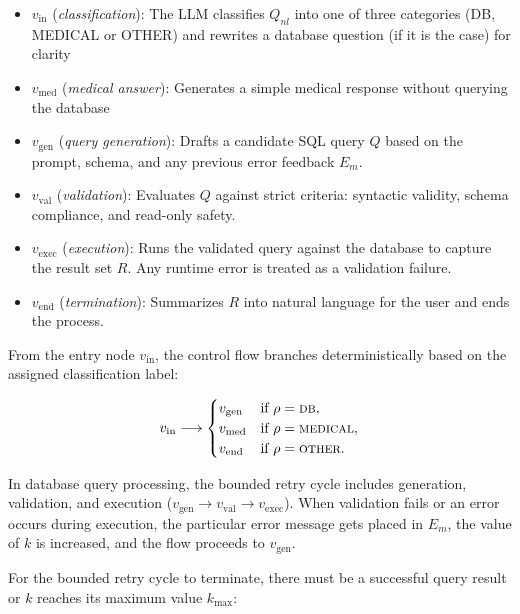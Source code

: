 \begin{itemize}
    \item $v_{\mathrm{in}}$ (\emph{classification}): The LLM classifies $Q_{nl}$ into one of three categories  (DB, MEDICAL or OTHER) and rewrites a database question (if it is the case) for clarity
    \item $v_{\mathrm{med}}$ (\emph{medical answer}): Generates a simple medical response without querying the database
    \item $v_{\mathrm{gen}}$ (\emph{query generation}): Drafts a candidate SQL query $Q$ based on the prompt, schema, and any previous error feedback $E_m$.
    \item $v_{\mathrm{val}}$ (\emph{validation}): Evaluates $Q$ against strict criteria: syntactic validity, schema compliance, and read-only safety.
    \item $v_{\mathrm{exec}}$ (\emph{execution}): Runs the validated query against the database to capture the result set $R$. Any runtime error is treated as a validation failure.
    \item $v_{\mathrm{end}}$ (\emph{termination}): Summarizes $R$ into natural language for the user and ends the process.
\end{itemize}

From the entry node $v_{\mathrm{in}}$, the control flow branches deterministically based on the assigned classification label:

\begin{equation}
    v_{\mathrm{in}} \longrightarrow
    \begin{cases}
        v_{\mathrm{gen}} & \text{if } \rho = \textsc{db},\\
        v_{\mathrm{med}} & \text{if } \rho = \textsc{medical},\\
        v_{\mathrm{end}} & \text{if } \rho = \textsc{other}.
    \end{cases}
    \label{eq:branch}
\end{equation}

In database query processing, the bounded retry cycle includes generation, validation, and execution ($v_{\mathrm{gen}} \to v_{\mathrm{val}} \to v_{\mathrm{exec}}$). When validation fails or an error occurs during execution, the particular error message gets placed in $E_m$, the value of $k$ is increased, and the flow proceeds to $v_{\mathrm{gen}}$.

For the bounded retry cycle to terminate, there must be a successful query result or $k$ reaches its maximum value $k_{\max}$:

